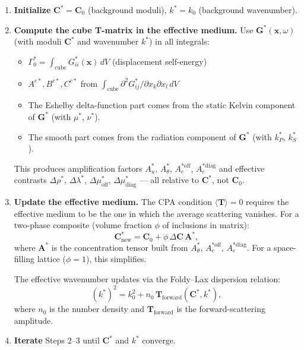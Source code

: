\documentclass[11pt,a4paper]{article}
\newcommand{\D}{\Delta}
\newcommand{\bG}{\bm{G}}
\newcommand{\bT}{\bm{T}}
\newcommand{\bC}{\bm{C}}
\begin{document}
\begin{enumerate}
  \item \textbf{Initialize} $\bC^* = \bC_0$ (background moduli),
    $k^* = k_0$ (background wavenumber).

  \item \textbf{Compute the cube T-matrix in the effective medium.}
    Use $\bG^*(\bm{x}, \omega)$ (with moduli $\bC^*$ and wavenumber
    $k^*$) in all integrals:
    \begin{itemize}[nosep]
      \item $\Gamma_0^* = \int_{\text{cube}} G^*_{ii}(\bm{x})\,dV$
        \quad (displacement self-energy)
      \item $A^{c*}, B^{c*}, C^{c*}$ from $\int_{\text{cube}}
        \partial^2 G^*_{ij}/\partial x_k \partial x_l\,dV$
      \item The Eshelby delta-function part comes from the static
        Kelvin component of $\bG^*$ (with $\mu^*$, $\nu^*$).
      \item The smooth part comes from the radiation component
        of $\bG^*$ (with $k^*_P$, $k^*_S$).
    \end{itemize}
    This produces amplification factors
    $A_u^*$, $A_\theta^*$, $A_e^{*\text{off}}$, $A_e^{*\text{diag}}$
    and effective contrasts
    $\D\rho^*$, $\D\lambda^*$, $\D\mu^*_{\text{off}}$,
    $\D\mu^*_{\text{diag}}$ --- all relative to $\bC^*$, not $\bC_0$.

  \item \textbf{Update the effective medium.}  The CPA condition
    $\langle\bT\rangle = 0$ requires the effective medium to be the
    one in which the average scattering vanishes.  For a two-phase
    composite (volume fraction $\phi$ of inclusions in matrix):
    \begin{equation}\label{eq:CPA}
      \bC^*_{\text{new}} = \bC_0 + \phi\,\D\bC\,\bm{A}^*,
    \end{equation}
    where $\bm{A}^*$ is the concentration tensor built from
    $A_\theta^*$, $A_e^{*\text{off}}$, $A_e^{*\text{diag}}$.
    For a space-filling lattice ($\phi = 1$), this simplifies.

    The effective wavenumber updates via the Foldy--Lax dispersion
    relation:
    \begin{equation}\label{eq:kstar}
      (k^*)^2 = k_0^2 + n_0\,\bT_{\text{forward}}(\bC^*, k^*),
    \end{equation}
    where $n_0$ is the number density and $\bT_{\text{forward}}$ is
    the forward-scattering amplitude.

  \item \textbf{Iterate} Steps 2--3 until $\bC^*$ and $k^*$ converge.
\end{enumerate}
\end{document}
